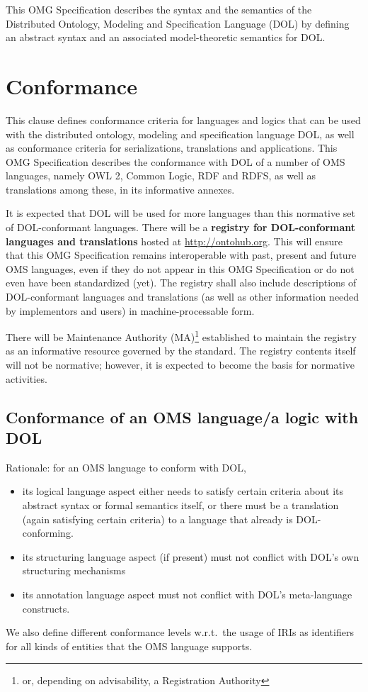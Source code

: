 \documentclass[10pt,%
\ifpretendfinal
final%
\else
draft%
\fi,
]{scrreprt}
\newcommand*{\IS}{OMG Specification\xspace}
\newcommand{\sclause}[1]{\section{#1}}
\begin{document}
This \IS describes the syntax and the semantics of the Distributed Ontology, Modeling and Specification Language (DOL) by defining an abstract syntax and an associated model-theoretic semantics for DOL. 


\chapter{Conformance}

This clause defines conformance criteria for languages and logics that
can be used with the distributed ontology, modeling and specification language
 DOL, as well as
conformance criteria for serializations, translations and
applications. This \IS describes the conformance
with DOL of a number of OMS languages, namely OWL 2, Common
Logic, RDF and RDFS, as well as translations among these, in its
informative annexes.

It is expected that DOL will be used for more languages than this
normative set of DOL-conformant languages. There will be a
\textbf{registry for DOL-conformant languages and translations} hosted
at \url{http://ontohub.org}.  This will ensure that this 
\IS remains interoperable with past, present and future OMS
languages, even if they do not appear in this \IS or do not even have
been standardized (yet).  The
registry shall also include descriptions of DOL-conformant languages
and translations (as well as other information needed by implementors
and users) in machine-processable form.  

There will be Maintenance Authority (MA)\footnote{ or, depending on
  advisability, a Registration Authority} established to maintain the
registry as an informative resource governed by the standard.  The
registry contents itself will not be normative; however, it is
expected to become the basis for normative activities.


\sclause{Conformance of an OMS language/a logic with DOL}\label{c:conform:logic}

Rationale: for an OMS language to conform with DOL,
\begin{itemize}
\item its logical language aspect either needs to satisfy certain criteria about its abstract syntax or formal semantics itself, or there must be a translation (again satisfying certain criteria) to a language that already is DOL-conforming.
\item its structuring language aspect (if present) must not conflict with DOL's own structuring mechanisms
\item its annotation language aspect must not conflict with DOL's meta-language constructs.
\end{itemize}
We also define different conformance levels w.r.t.\ the usage of IRIs as identifiers for all kinds of entities that the OMS language supports.
\end{document}
